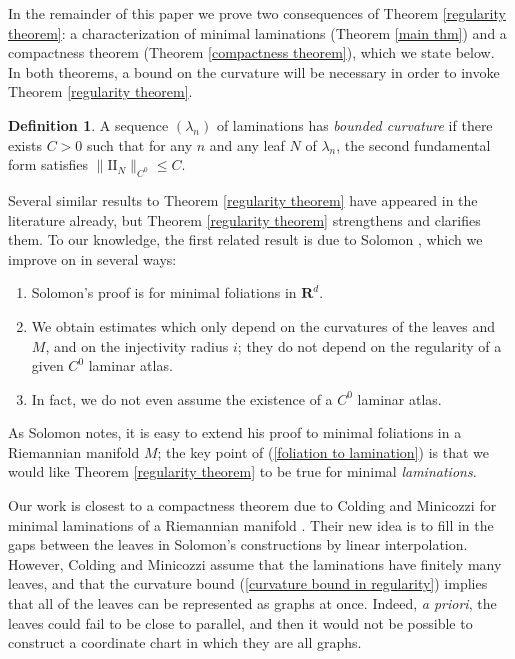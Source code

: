 \documentclass[reqno,11pt]{amsart}
\newcommand{\RR}{\mathbf{R}}
\newcommand{\Two}{\mathrm{I\!I}}
\newcommand{\dfn}[1]{\emph{#1}\index{#1}}
\theoremstyle{definition}
\newtheorem{definition}[theorem]{Definition}
\numberwithin{equation}{section}
\begin{document}
In the remainder of this paper we prove two consequences of Theorem \ref{regularity theorem}: a characterization of minimal laminations (Theorem \ref{main thm}) and a compactness theorem (Theorem \ref{compactness theorem}), which we state below.
In both theorems, a bound on the curvature will be necessary in order to invoke Theorem \ref{regularity theorem}.

\begin{definition}
A sequence $(\lambda_n)$ of laminations has \dfn{bounded curvature} if there exists $C > 0$ such that for any $n$ and any leaf $N$ of $\lambda_n$, the second fundamental form satisfies $\|\Two_N\|_{C^0} \leq C$.
\end{definition}

Several similar results to Theorem \ref{regularity theorem} have appeared in the literature already, but Theorem \ref{regularity theorem} strengthens and clarifies them.
To our knowledge, the first related result is due to Solomon \cite[Theorem 1.1]{Solomon86}, which we improve on in several ways:
\begin{enumerate}
\item \label{foliation to lamination} Solomon's proof is for minimal foliations in $\RR^d$.
\item We obtain estimates which only depend on the curvatures of the leaves and $M$, and on the injectivity radius $i$; they do not depend on the regularity of a given $C^0$ laminar atlas.
\item In fact, we do not even assume the existence of a $C^0$ laminar atlas.
\end{enumerate}
As Solomon notes, it is easy to extend his proof to minimal foliations in a Riemannian manifold $M$; the key point of (\ref{foliation to lamination}) is that we would like Theorem \ref{regularity theorem} to be true for minimal \emph{laminations}.

Our work is closest to a compactness theorem due to Colding and Minicozzi for minimal laminations of a Riemannian manifold \cite[Appendix B]{ColdingMinicozziIV}.
Their new idea is to fill in the gaps between the leaves in Solomon's constructions by linear interpolation.
However, Colding and Minicozzi assume that the laminations have finitely many leaves, and that the curvature bound (\ref{curvature bound in regularity}) implies that all of the leaves can be represented as graphs at once.
Indeed, \emph {a priori}, the leaves could fail to be close to parallel, and then it would not be possible to construct a coordinate chart in which they are all graphs.
\end{document}
